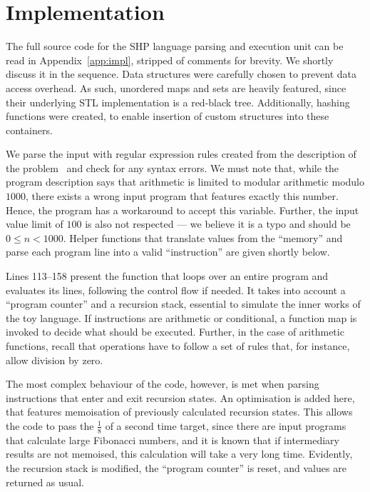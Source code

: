 \documentclass[12pt]{article}
\begin{document}
\section{Implementation}\label{sec:imp}

The full source code for the SHP language parsing and execution unit can be read in Appendix~\ref{app:impl}, stripped of comments for brevity. We shortly discuss it in the sequence. Data structures were carefully chosen to prevent data access overhead. As such, unordered maps and sets are heavily featured, since their underlying STL implementation is a red-black tree. Additionally, hashing functions were created, to enable insertion of custom structures into these containers. 

We parse the input with regular expression rules created from the description of the problem~\cite{Demasi:misc:2013:may} and check for any syntax errors. We must note that, while the program description says that arithmetic is limited to modular arithmetic modulo $1000$, there exists a wrong input program that features exactly this number. Hence, the program has a workaround to accept this variable. Further, the input value limit of $100$ is also not respected --- we believe it is a typo and should be $0 \leq n < 1000$. Helper functions that translate values from the ``memory'' and parse each program line into a valid ``instruction'' are given shortly below.

Lines 113--158 present the function that loops over an entire program and evaluates its lines, following the control flow if needed. It takes into account a ``program counter'' and a recursion stack, essential to simulate the inner works of the toy language. If instructions are arithmetic or conditional, a function map is invoked to decide what should be executed. Further, in the case of arithmetic functions, recall that operations have to follow a set of rules that, for instance, allow division by zero.

The most complex behaviour of the code, however, is met when parsing instructions that enter and exit recursion states. An optimisation is added here, that features memoisation of previously calculated recursion states. This allows the code to pass the $\frac{1}{8}$ of a second time target, since there are input programs that calculate large Fibonacci numbers, and it is known that if intermediary results are not memoised, this calculation will take a very long time. Evidently, the recursion stack is modified, the ``program counter'' is reset, and values are returned as usual.
\end{document}
